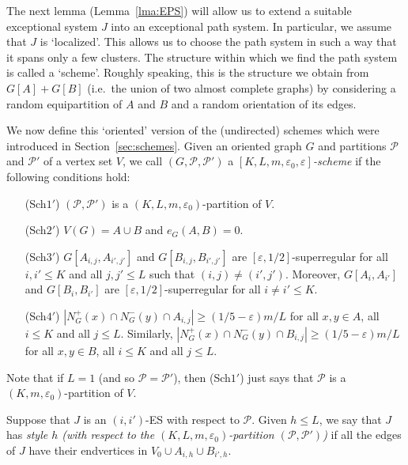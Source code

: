 \documentclass{memo-l}
\def\COMMENT#1{}
\def\cP{\mathcal{P}}
\def\eps{\varepsilon}
\numberwithin{section}{chapter}
\numberwithin{equation}{section}
\numberwithin{firstthm}{section}
\numberwithin{figure}{section}
\begin{document}
The next lemma (Lem\-ma~\ref{lma:EPS}) will allow us to extend a suitable exceptional system  $J$ into an exceptional path system.
In particular, we assume that $J$ is `localized'. This allows us to choose the path system in such a way that it spans only a few clusters.
The structure within which we find the path system is called a `scheme'.
Roughly speaking, this is the structure we obtain from  $G[A]+G[B]$ (i.e.~the union of two almost complete graphs)
by considering a random equipartition of $A$ and $B$ and a random orientation of its edges.

We now define this `oriented' version of the (undirected) schemes which were introduced in Section~\ref{sec:schemes}.
Given an oriented graph $G$ and partitions $\mathcal P$ and $\cP'$ of a vertex set $V$, we call $(G, \mathcal{P},\mathcal{P}')$ a
\emph{$[K,L,m,\eps_0,\eps]$-scheme} if the following conditions hold:%
    \COMMENT{Daniela: had $G=G[A]+G[B]$ instead of $e_G(A,B)=0$ in (Sch$2'$). But using $e_G(A,B)=0$ makes it more similar to (Sch2).}
\begin{itemize}
\item[(Sch$1'$)] $(\mathcal{P},\mathcal{P}')$ is a $(K,L,m,\eps_0)$-partition of $V$.
\item[(Sch$2'$)] $V(G)=A\cup B$ and $e_G(A,B)=0$.
\item[(Sch$3'$)] $G[A_{i,j},A_{i',j'}]$ and $G[B_{i,j}, B_{i',j'}]$ are $[\eps, 1/2]$-superregular
for all $i, i'\le K$ and all $j, j' \leq L$ such that $(i,j)\not =(i',j')$. Moreover, $G[A_i,A_{i'}]$ and $G[B_i, B_{i'}]$ are $[\eps, 1/2]$-superregular
for all $i\not =i'\le K$.
\item[(Sch$4'$)] $|N_{G}^+(x)\cap N_{G}^-(y)\cap A_{i,j}|\ge (1/5 - \eps) m/L $ for all $x,y\in A$, all $i\le K$ and all $j\le L$.
Similarly, $|N_{G}^+(x)\cap N_{G}^-(y)\cap B_{i,j}|\ge (1/5 - \eps) m/L$ for all $x,y\in B$, all $i\le K$ and all $j\le L$.
\end{itemize}

Note that if $L=1$ (and so $\mathcal{P}=\mathcal{P}'$), then (Sch$1'$) just says that
$\mathcal{P}$ is a $(K,m,\eps_0)$-partition of $V$.%
\COMMENT{Deryk: eliminated the special notation for  $L=1$ as it occurred only once}

Suppose that $J$ is an $(i, i' )$-ES with respect to $\cP$.
Given $h\le L$, we say that $J$ has \emph{style $h$ (with respect to the $(K,L,m,\eps_0)$-partition
$(\mathcal{P},\mathcal{P}')$)} if all the edges of $J$
have their endvertices in $V_0\cup A_{i,h}\cup B_{i',h}$.
\end{document}
